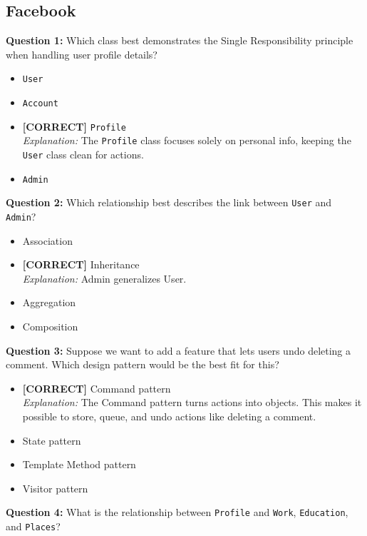 \subsection*{Facebook}
\vspace{0.3cm}
\noindent
\textbf{Question 1:} Which class best demonstrates the Single Responsibility principle when handling user profile details?
\\[0.2cm]
\begin{itemize}
 \item \texttt{User}
 \item \texttt{Account}
 \item \textbf{[CORRECT]} \texttt{Profile}
\\[0.1cm]
\textit{Explanation:} 
The \texttt{Profile} class focuses solely on personal info, keeping the \texttt{User} class clean for actions.
 \item \texttt{Admin}
\end{itemize}
\vspace{0.3cm}
\noindent
\textbf{Question 2:} Which relationship best describes the link between \texttt{User} and \texttt{Admin}?
\\[0.2cm]
\begin{itemize}
 \item Association
 \item \textbf{[CORRECT]} Inheritance
\\[0.1cm]
\textit{Explanation:} 
Admin generalizes User.
 \item Aggregation
 \item Composition
\end{itemize}
\vspace{0.3cm}
\noindent
\textbf{Question 3:} Suppose we want to add a feature that lets users undo deleting a comment. Which design pattern would be the best fit for this?
\\[0.2cm]
\begin{itemize}
 \item \textbf{[CORRECT]} Command pattern
\\[0.1cm]
\textit{Explanation:} 
The Command pattern turns actions into objects. This makes it possible to store, queue, and undo actions like deleting a comment.
 \item State pattern
 \item Template Method pattern
 \item Visitor pattern
\end{itemize}
\vspace{0.3cm}
\noindent
\textbf{Question 4:} What is the relationship between \texttt{Profile} and \texttt{Work}, \texttt{Education}, and \texttt{Places}?

